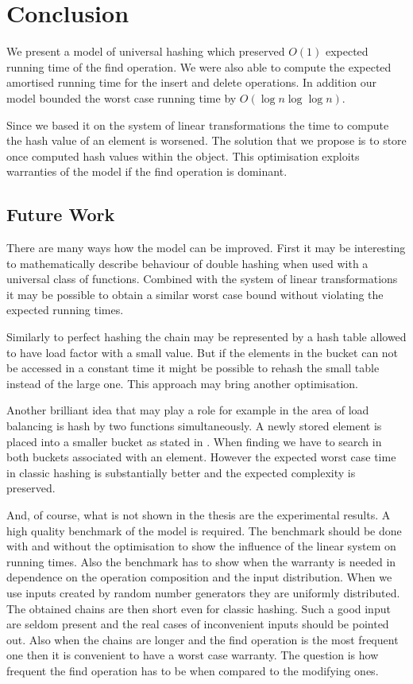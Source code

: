 \chapter{Conclusion}
We present a model of universal hashing which preserved $O(1)$ expected running time of the find operation. We were also able to compute the expected amortised running time for the insert and delete operations. In addition our model bounded the worst case running time by $O(\log n \log \log n)$. 

Since we based it on the system of linear transformations the time to compute the hash value of an element is worsened. The solution that we propose is to store once computed hash values within the object. This optimisation exploits warranties of the model if the find operation is dominant. 

\section{Future Work}
There are many ways how the model can be improved. First it may be interesting to mathematically describe behaviour of double hashing when used with a universal class of functions. Combined with the system of linear transformations it may be possible to obtain a similar worst case bound without violating the expected running times. 

Similarly to perfect hashing the chain may be represented by a hash table allowed to have load factor with a small value. But if the elements in the bucket can not be accessed in a constant time it might be possible to rehash the small table instead of the large one. This approach may bring another optimisation.

Another brilliant idea that may play a role for example in the area of load balancing is hash by two functions simultaneously. A newly stored element is placed into a smaller bucket as stated in \cite{1076315}. When finding we have to search in both buckets associated with an element. However the expected worst case time in classic hashing is substantially better and the expected complexity is preserved.

And, of course, what is not shown in the thesis are the experimental results. A high quality benchmark of the model is required. The benchmark should be done with and without the optimisation to show the influence of the linear system on running times. Also the benchmark has to show when the warranty is needed in dependence on the operation composition and the input distribution. When we use  inputs created by random number generators they are uniformly distributed. The obtained chains are then short even for classic hashing. Such a good input are seldom present and the real cases of inconvenient inputs should be pointed out. Also when the chains are longer and the find operation is the most frequent one then it is convenient to have a worst case warranty. The question is how frequent the find operation has to be when compared to the modifying ones.

